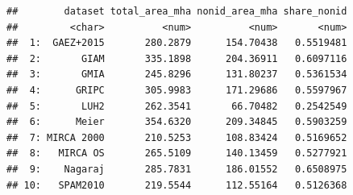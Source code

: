 \documentclass[
  11pt,
]{article}
\begin{document}
\begin{verbatim}
##        dataset total_area_mha nonid_area_mha share_nonid
##         <char>          <num>          <num>       <num>
##  1:  GAEZ+2015       280.2879      154.70438   0.5519481
##  2:       GIAM       335.1898      204.36911   0.6097116
##  3:       GMIA       245.8296      131.80237   0.5361534
##  4:      GRIPC       305.9983      171.29686   0.5597967
##  5:       LUH2       262.3541       66.70482   0.2542549
##  6:      Meier       354.6320      209.34845   0.5903259
##  7: MIRCA 2000       210.5253      108.83424   0.5169652
##  8:   MIRCA OS       265.5109      140.13459   0.5277921
##  9:    Nagaraj       285.7831      186.01552   0.6508975
## 10:   SPAM2010       219.5544      112.55164   0.5126368
\end{verbatim}
\end{document}
